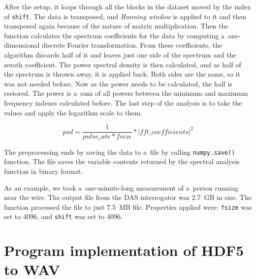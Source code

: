 After the setup, it loops through all the blocks in the dataset moved by the index of \texttt{shift}. The data is transposed, and \textit{Hanning window} is applied to it and then transposed again because of the nature of matrix multiplication. Then the function calculates the spectrum coefficients for the data by computing a~one-dimensional discrete Fourier transformation. From these coefficients, the algorithm discards half of it and leaves just one side of the spectrum and the zeroth coefficient. The power spectral density is then calculated, and as half of the spectrum is thrown away, it is applied back. Both sides are the same, so it was not needed before. Now as the power needs to be calculated, the half is restored. The power is a~sum of all powers between the minimum and maximum frequency indexes calculated before. The last step of the analysis is to take the values and apply the logarithm scale to them. 

\begin{equation}
    psd = \frac{1}{pulse_rate*fsize} * |fft\_coefficients|^2
\end{equation}

The preprocessing ends by saving the data to a~file by calling \texttt{numpy.save()} function. The file saves the variable contents returned by the spectral analysis function in binary format.

As an example, we took a~one-minute-long measurement of a~person running near the wire. The output file from the DAS interrogator was \qty{2.7}{GB} in size. The function processed the file to just \qty{7.5}{MB} file. Properties applied were: \texttt{fsize} was set to 4096, and \texttt{shift} was set to 4096.











\section{Program implementation of HDF5 to WAV}\label{lab:hdftowav}\label{txt.implementation.wav}

